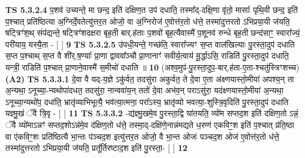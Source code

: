 \documentclass[17pt]{extarticle}
\begin{document}
                  \newline
                                \textbf{ TS 5.3.2.4} \newline
                  प॒शव॑ उच्यन्ते॒ मा छन्द॒ इति॑ दक्षिण॒त उप॑ दधाति॒ तस्मा᳚द्-दक्षि॒णा वृ॑तो॒ मासाः᳚ पृथि॒वी छन्द॒ इति॑ प॒श्चात् प्रति॑ष्ठित्या अ॒ग्निर्दे॒वतेत्यु॑त्तर॒त ओजो॒ वा अ॒ग्निरोज॑ ए॒वोत्त॑र॒तो ध॑त्ते॒ तस्मा॑दुत्तरतो ऽभिप्रया॒यी ज॑यति॒ षट्त्रिꣳ॑श॒थ् संप॑द्यन्ते॒ षट्त्रिꣳ॑शदक्षरा बृह॒ती बार्.ह॑ताः प॒शवो॑ बृह॒त्यैवास्मै॑ प॒शूनव॑ रुन्धे बृह॒ती छन्द॑साꣳ॒॒ स्वारा᳚ज्यं॒ परी॑याय॒ यस्यै॒ता - [  ] \textbf{  9} \newline
                  \newline
                                \textbf{ TS 5.3.2.5} \newline
                  उ॑पधी॒यन्ते॒ गच्छ॑ति॒ स्वारा᳚ज्यꣳ स॒प्त वाल॑खिल्याः पु॒रस्ता॒दुप॑ दधाति स॒प्त प॒श्चाथ् स॒प्त वै शी॑र्.ष॒ण्याः᳚ प्रा॒णा द्वाववा᳚ञ्चौ प्रा॒णानाꣳ॑ सवीर्य॒त्वाय॑ मू॒र्द्धाऽसि॒ राडिति॑ पु॒रस्ता॒दुप॑ दधाति॒ यन्त्री॒ राडिति॑ प॒श्चात् प्रा॒णाने॒वास्मै॑ स॒मीचो॑ दधाति ॥ \textbf{  10 } \newline
                  \newline
                      (अश्व॒मुप॑-पु॒रस्ता॒दुप॒-बार्.ह॑ता-ए॒ता-श्चतु॑स्त्रिꣳशच्च)  \textbf{(A2)} \newline \newline
                                        \textbf{ TS 5.3.3.1} \newline
                  दे॒वा वै यद्-य॒ज्ञे ऽकु॑र्वत॒ तदसु॑रा अकुर्वत॒ ते दे॒वा ए॒ता अ॑क्ष्णयास्तो॒मीया॑ अपश्य॒न् ता अ॒न्यथा॒ ऽनूच्या॒-न्यथोपा॑दधत॒ तदसु॑रा॒ नान्ववा॑य॒न् ततो॑ दे॒वा अभ॑व॒न् पराऽसु॑रा॒ यद॑क्ष्णयास्तो॒मीया॑ अ॒न्यथा॒ ऽनूच्या॒न्यथो॑प॒ दधा॑ति॒ भ्रातृ॑व्याभिभूत्यै॒ भव॑त्या॒त्मना॒ परा᳚ऽस्य॒ भ्रातृ॑व्यो भवत्या॒-शुस्त्रि॒वृदिति॑ पु॒रस्ता॒दुप॑ दधाति यज्ञ्मु॒खं ॅवै त्रि॒वृ - [  ] \textbf{  11} \newline
                  \newline
                                \textbf{ TS 5.3.3.2} \newline
                  -द्य॑ज्ञ्मु॒खमे॒व पु॒रस्ता॒द्वि या॑तयति॒ व्यो॑म सप्तद॒श इति॑ दक्षिण॒तो ऽन्नं॒ ॅवै व्यो॑माऽन्नꣳ॑ सप्तद॒शोऽन्न॑मे॒व द॑क्षिण॒तो ध॑त्ते॒ तस्मा॒द्-दक्षि॑णे॒नान्न॑मद्यते ध॒रुण॑ एकविꣳ॒॒श इति॑ प॒श्चात् प्र॑ति॒ष्ठा वा ए॑कविꣳ॒॒शः प्रति॑ष्ठित्यै भा॒न्तः प॑ञ्चद॒श इत्यु॑त्तर॒त ओजो॒ वै भा॒न्त ओजः॑ पञ्चद॒श ओज॑ ए॒वोत्त॑र॒तो ध॑त्ते॒ तस्मा॑दुत्तरतो ऽभिप्रया॒यी ज॑यति॒ प्रतू᳚र्तिरष्टाद॒श इति॑ पु॒रस्ता॒- [  ] \textbf{  12} \newline
\end{document}
